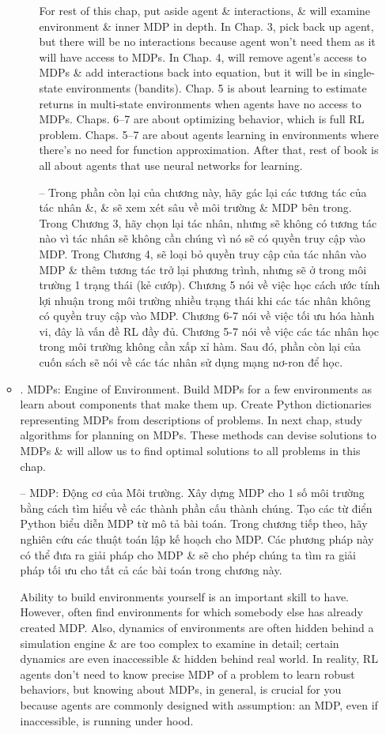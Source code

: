 \documentclass{article}
\begin{document}
\begin{itemize}
\begin{itemize}
\begin{itemize}
            For rest of this chap, put aside agent \& interactions, \& will examine environment \& inner MDP in depth. In Chap. 3, pick back up agent, but there will be no interactions because agent won't need them as it will have access to MDPs. In Chap. 4, will remove agent's access to MDPs \& add interactions back into equation, but it will be in single-state environments (bandits). Chap. 5 is about learning to estimate returns in multi-state environments when agents have no access to MDPs. Chaps. 6--7 are about optimizing behavior, which is full RL problem. Chaps. 5--7 are about agents learning in environments where there's no need for function approximation. After that, rest of book is all about agents that use neural networks for learning.

            -- Trong phần còn lại của chương này, hãy gác lại các tương tác của tác nhân \&, \& sẽ xem xét sâu về môi trường \& MDP bên trong. Trong Chương 3, hãy chọn lại tác nhân, nhưng sẽ không có tương tác nào vì tác nhân sẽ không cần chúng vì nó sẽ có quyền truy cập vào MDP. Trong Chương 4, sẽ loại bỏ quyền truy cập của tác nhân vào MDP \& thêm tương tác trở lại phương trình, nhưng sẽ ở trong môi trường 1 trạng thái (kẻ cướp). Chương 5 nói về việc học cách ước tính lợi nhuận trong môi trường nhiều trạng thái khi các tác nhân không có quyền truy cập vào MDP. Chương 6-7 nói về việc tối ưu hóa hành vi, đây là vấn đề RL đầy đủ. Chương 5-7 nói về việc các tác nhân học trong môi trường không cần xấp xỉ hàm. Sau đó, phần còn lại của cuốn sách sẽ nói về các tác nhân sử dụng mạng nơ-ron để học.
        \end{itemize}
        \item {. MDPs: Engine of Environment.} Build MDPs for a few environments as learn about components that make them up. Create Python dictionaries representing MDPs from descriptions of problems. In next chap, study algorithms for planning on MDPs. These methods can devise solutions to MDPs \& will allow us to find optimal solutions to all problems in this chap.

        -- {\sf MDP: Động cơ của Môi trường.} Xây dựng MDP cho 1 số môi trường bằng cách tìm hiểu về các thành phần cấu thành chúng. Tạo các từ điển Python biểu diễn MDP từ mô tả bài toán. Trong chương tiếp theo, hãy nghiên cứu các thuật toán lập kế hoạch cho MDP. Các phương pháp này có thể đưa ra giải pháp cho MDP \& sẽ cho phép chúng ta tìm ra giải pháp tối ưu cho tất cả các bài toán trong chương này.

        Ability to build environments yourself is an important skill to have. However, often find environments for which somebody else has already created MDP. Also, dynamics of environments are often hidden behind a simulation engine \& are too complex to examine in detail; certain dynamics are even inaccessible \& hidden behind real world. In reality, RL agents don't need to know precise MDP of a problem to learn robust behaviors, but knowing about MDPs, in general, is crucial for you because agents are commonly designed with assumption: an MDP, even if inaccessible, is running under hood.


\end{itemize}
\end{itemize}
\end{document}
